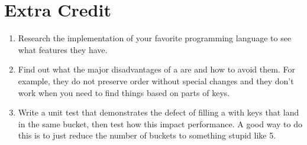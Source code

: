 \section{Extra Credit}

\begin{enumerate}
\item Research the  implementation of your favorite programming language to see what features they have.
\item Find out what the major disadvantages of a  are and how to avoid them.  For example, they
    do not preserve order without special changes and they don't work when you need to find things based on parts
    of keys.
\item Write a unit test that demonstrates the defect of filling a  with keys that land
    in the same bucket, then test how this impact performance.  A good way to do this is to just reduce
    the number of buckets to something stupid like 5.
\end{enumerate}

